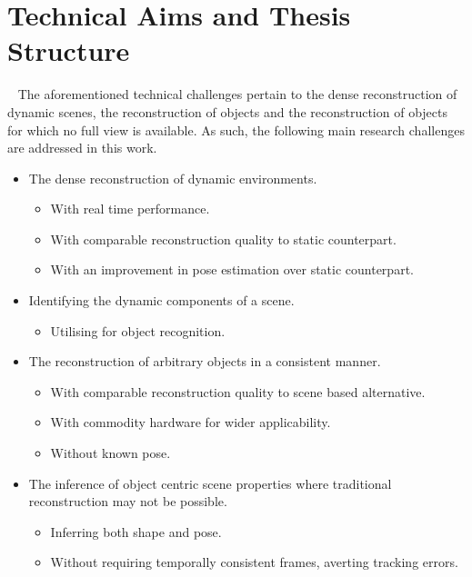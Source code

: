 \section{Technical Aims and Thesis Structure}
~\label{sec:intro_aims_structure}
The aforementioned technical challenges pertain to the dense reconstruction of dynamic scenes, the 
reconstruction of objects and the reconstruction of objects for which no full view is available. As 
such, the following main research challenges are addressed in this work.
\begin{itemize}
  \item The dense reconstruction of dynamic environments.
  \begin{itemize}
    \item With real time performance.
    \item With comparable reconstruction quality to static counterpart.
    \item With an improvement in pose estimation over static counterpart.
  \end{itemize}
  \item Identifying the dynamic components of a scene.
  \begin{itemize}
    \item Utilising for object recognition.
  \end{itemize}
  \item The reconstruction of arbitrary objects in a consistent manner.
  \begin{itemize}
    \item With comparable reconstruction quality to scene based alternative.
    \item With commodity hardware for wider applicability.
    \item Without known pose.
  \end{itemize}
  \item The inference of object centric scene properties where traditional reconstruction 
may not be possible.
  \begin{itemize}
    \item Inferring both shape and pose.
    \item Without requiring temporally consistent frames, averting tracking errors.
  \end{itemize}
\end{itemize}

